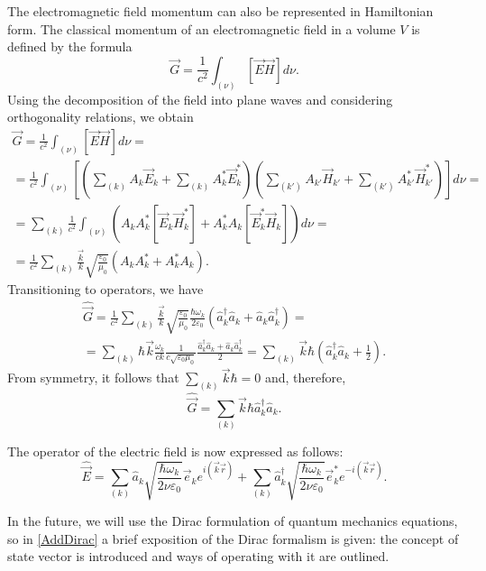 The electromagnetic field momentum can also be represented in Hamiltonian form. The classical momentum of an electromagnetic field in a volume $V$ is defined by the formula
\begin{equation}
\vec{G} = \frac{1}{c^2} \int_{(\nu)}
\left[\vec{E} \vec{H} \right] d \nu.
\label{eqCh1_task3_1}
\end{equation}
Using the decomposition of the field into plane waves and considering orthogonality relations, we obtain
\begin{eqnarray}
  \vec{G} = \frac{1}{c^2} \int_{(\nu)}
  \left[\vec{E} \vec{H} \right] d \nu =
  \nonumber \\
  =
  \frac{1}{c^2} \int_{(\nu)}
  \left[
    \left(\sum_{(k)} A_k \vec{E}_k +
    \sum_{(k)} A_k^\ast \vec{E}_k^\ast \right)
    \left(\sum_{(k')} A_{k'} \vec{H}_{k'} +
    \sum_{(k')} A_{k'}^\ast \vec{H}_{k'}^\ast \right)\right]
  d \nu =
  \nonumber \\
  =
  \sum_{(k)}
  \frac{1}{c^2} \int_{(\nu)}
  \left(
  A_k A_k^\ast \left[\vec{E}_k \vec{H}_k^\ast \right]
  +
  A_k^\ast A_k \left[\vec{E}_k^\ast \vec{H}_k \right]
  \right)
  d \nu =
  \nonumber \\
  =
  \frac{1}{c^2} \sum_{(k)} \frac{\vec{k}}{k}
  \sqrt{\frac{\varepsilon_0}{\mu_0}}
  \left(
  A_k A_k^\ast + A_k^\ast A_k
  \right).
  \nonumber
\end{eqnarray}
Transitioning to operators, we have
\begin{eqnarray}
  \hat{\vec{G}} =
  \frac{1}{c^2} \sum_{(k)} \frac{\vec{k}}{k}
  \sqrt{\frac{\varepsilon_0}{\mu_0}}
  \frac{\hbar \omega_k}{2 \varepsilon_0}
  \left(\hat{a}_k^{\dag} \hat{a}_k + \hat{a}_k \hat{a}_k^{\dag}\right)
  =
  \nonumber \\
  =
  \sum_{(k)}
  \hbar
  \vec{k}
  \frac{\omega_k}{c k}
  \frac{1}{c \sqrt{\varepsilon_0 \mu_0}}
  \frac{\hat{a}_k^{\dag} \hat{a}_k + \hat{a}_k \hat{a}_k^{\dag}}{2}
  =
  \sum_{(k)} \vec{k} \hbar\left( \hat{a}_k^{\dag} \hat{a}_k +
\frac{1}{2} \right).
\nonumber
\end{eqnarray}
From symmetry, it follows that $\sum_{(k)} \vec{k} \hbar = 0$ and, therefore,
\begin{equation}
\hat{\vec{G}} = \sum_{(k)} \vec{k} \hbar\hat{a}_k^{\dag} \hat{a}_k.
\label{eqCh1_task3_2}
\end{equation}

The operator of the electric field is now expressed as follows:
\begin{equation}
\hat{\vec{E}} = \sum_{(k)} \hat{a}_k\sqrt{\frac{\hbar \omega_k}{2 \nu
    \varepsilon_0}} \vec{e}_k e^{i\left(\vec{k}\vec{r}\right)} +
\sum_{(k)} \hat{a}_k^{\dag}\sqrt{\frac{\hbar \omega_k}{2 \nu
    \varepsilon_0}} \vec{e}_k^{*} e^{-i\left(\vec{k}\vec{r}\right)}.
\end{equation}

In the future, we will use the Dirac formulation of quantum mechanics equations, so in \autoref{AddDirac} a brief exposition of the Dirac formalism is given: the concept of state vector is introduced and ways of operating with it are outlined.  